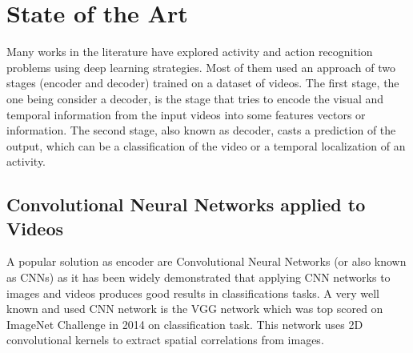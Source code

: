 \chapter{State of the Art}




Many works in the literature have explored activity and action recognition problems using deep learning strategies. Most of them used an approach of two stages (encoder and decoder) trained on a dataset of videos. The first stage, the one being consider a decoder, is the stage that tries to encode the visual and temporal information from the input videos into some features vectors or information. The second stage, also known as decoder, casts a prediction of the output, which can be a classification of the video or a temporal localization of an activity.

\section{Convolutional Neural Networks applied to Videos}

A popular solution as encoder are Convolutional Neural Networks (or also known as CNNs) as it has been widely demonstrated that applying CNN networks to images and videos produces good results in classifications tasks. A very well known and used CNN network is the VGG\cite{Simonyan14c} network which was top scored on ImageNet Challenge in 2014 on classification task. This network uses 2D convolutional kernels to extract spatial correlations from images.

